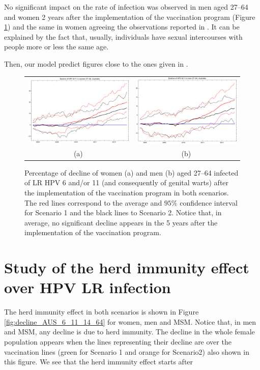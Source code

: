 No significant impact on the rate of infection was observed in men aged 27–64 and women 2 years after the implementation of the vaccination program (Figure \ref{fig:decline_AUS_6_11_27_64}) and the same in women agreeing the observations reported in \cite{ali2013genital}. It can be explained by the fact that, usually, individuals have sexual intercourses with people more or less the same age.

Then, our model predict figures close to the ones given in \cite{ali2013genital}.

\begin{figure}[!]
	\centering
	\begin{tabular}{cc}
		\includegraphics[width=0.5\linewidth]{IMGs/3.-Australia/Decl_muj_27_64_verr_Australia.pdf}	& 
		\includegraphics[width=0.5\linewidth]{IMGs/3.-Australia/Decl_hom_27_64_verr_Australia.pdf}  \\ 
		(a)	& (b) 
	\end{tabular} 
	\caption{Percentage of decline of women (a) and men (b) aged 27–64 infected of LR HPV 6 and/or 11 (and consequently of genital warts) after the implementation of the vaccination program in both scenarios. The red lines correspond to the average and $95\%$ confidence interval for Scenario 1 and the black lines to Scenario 2. Notice that, in average, no significant decline appears in the 5 years after the implementation of the vaccination program.}
	\label{fig:decline_AUS_6_11_27_64}
\end{figure}

\section{Study of the herd immunity effect over HPV LR infection}
The herd immunity effect in both scenarios is shown in Figure \ref{fig:decline_AUS_6_11_14_64} for women, men and MSM. Notice that, in men and MSM, any decline is due to herd immunity. The decline in the whole female population appears when the lines representing their decline are over the vaccination lines (green for Scenario 1 and orange for Scenario2) also shown in this figure. We see that the herd immunity effect starts after 


